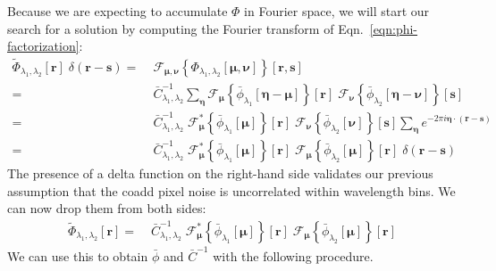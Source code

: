 \documentclass[DM,authoryear,toc]{lsstdoc}
\begin{document}
Because we are expecting to accumulate $\Phi$ in Fourier space, we will start our search for a solution by computing the Fourier transform of Eqn.~\ref{eqn:phi-factorization}:
\begin{align}
    \widetilde{\Phi}_{\lambda_1,\lambda_2}[\bm{r}]
    \;
    \delta(\bm{r}-\bm{s})
=&\;
    \mathcal{F}_{\bm{\mu},\bm{\nu}}\!\left\{
        \Phi_{\lambda_1,\lambda_2}[\bm{\mu},\bm{\nu}]
    \right\}\!\left[\bm{r},\bm{s}\right]
\\
=&\;
    \bar{C}^{-1}_{\lambda_1,\lambda_2}
    \sum_{\bm{\eta}}
    \mathcal{F}_{\bm{\mu}}\!\left\{
        \bar{\phi}_{\lambda_1}[\bm{\eta}-\bm{\mu}]
    \right\}\!\left[
        \bm{r}
    \right]
    \;
    \mathcal{F}_{\bm{\nu}}\!\left\{
        \bar{\phi}_{\lambda_2}[\bm{\eta}-\bm{\nu}]
    \right\}\!\left[
        \bm{s}
    \right]
\\
=&\;
    \bar{C}^{-1}_{\lambda_1,\lambda_2}
    \;
    \mathcal{F}^*_{\bm{\mu}}\!\left\{
        \bar{\phi}_{\lambda_1}[\bm{\mu}]
    \right\}\!\left[
        \bm{r}
    \right]
    \;
    \mathcal{F}_{\bm{\nu}}\!\left\{
        \bar{\phi}_{\lambda_2}[\bm{\nu}]
    \right\}\!\left[
        \bm{s}
    \right]
    \sum_{\bm{\eta}}
    e^{-2\pi i \bm{\eta}\cdot(\bm{r}-\bm{s})}
\\
=&\;
    \bar{C}^{-1}_{\lambda_1,\lambda_2}
    \;
    \mathcal{F}^*_{\bm{\mu}}\!\left\{
        \bar{\phi}_{\lambda_1}[\bm{\mu}]
    \right\}\!\left[
        \bm{r}
    \right]
    \;
    \mathcal{F}_{\bm{\mu}}\!\left\{
        \bar{\phi}_{\lambda_2}[\bm{\mu}]
    \right\}\!\left[
        \bm{r}
    \right]
    \;
    \delta(\bm{r}-\bm{s})
\end{align}
The presence of a delta function on the right-hand side validates our previous assumption that the coadd pixel noise is uncorrelated within wavelength bins.
We can now drop them from both sides:
\begin{align}
    \widetilde{\Phi}_{\lambda_1,\lambda_2}[\bm{r}]
= & \;
    \bar{C}^{-1}_{\lambda_1,\lambda_2}
    \;
    \mathcal{F}^*_{\bm{\mu}}\!\left\{
        \bar{\phi}_{\lambda_1}[\bm{\mu}]
    \right\}\!\left[
        \bm{r}
    \right]
    \;
    \mathcal{F}_{\bm{\mu}}\!\left\{
        \bar{\phi}_{\lambda_2}[\bm{\mu}]
    \right\}\!\left[
        \bm{r}
    \right]
\end{align}
We can use this to obtain $\bar{\phi}$ and $\bar{C}^{-1}$ with the following procedure.
\end{document}
